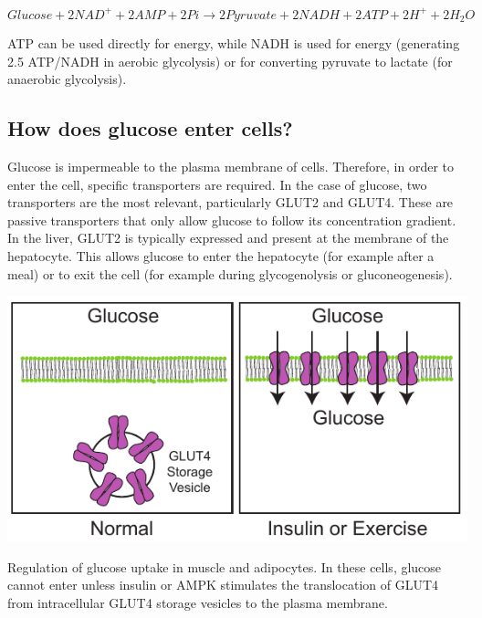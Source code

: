 \documentclass{tufte-handout}
\begin{document}
\begin{equation}\label{eq:overall}
Glucose + 2NAD^+ + 2AMP + 2Pi \rightarrow 2Pyruvate + 2NADH + 2ATP + 2H^+ +2H_2O
\end{equation}

ATP can be used directly for energy, while NADH is used for energy (generating 2.5 ATP/NADH in aerobic glycolysis) or for converting pyruvate to lactate (for anaerobic glycolysis).

\subsection{How does glucose enter cells?}

Glucose is impermeable to the plasma membrane of cells.  Therefore, in order to enter the cell, specific transporters are required.  In the case of glucose, two transporters are the most relevant, particularly GLUT2 and GLUT4.  These are passive transporters that only allow glucose to follow its concentration gradient.  In the liver, GLUT2 is typically expressed and present at the membrane of the hepatocyte.  This allows glucose to enter the hepatocyte (for example after a meal) or to exit the cell (for example during glycogenolysis or gluconeogenesis).

\begin{marginfigure}
\includegraphics{figures/GLUT4-Trafficking.pdf}
\caption{Regulation of glucose uptake in muscle and adipocytes.  In these cells, glucose cannot enter unless insulin or AMPK stimulates the translocation of GLUT4 from intracellular GLUT4 storage vesicles to the plasma membrane.}
\label{fig:GLUT4-Trafficking}
\end{marginfigure}
\end{document}
